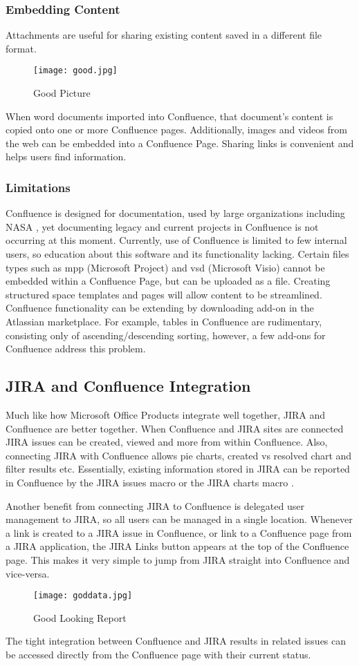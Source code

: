 \subsubsection{Embedding Content}
Attachments are useful for sharing existing content saved in a different file format. 
\begin{figure}[H]
	\centering
	\texttt{[image: good.jpg]}
	\caption{Good Picture}
\end{figure} 
When word documents imported into Confluence, that document's content is copied onto one or more Confluence pages. Additionally, images and videos from the web can be embedded into a Confluence Page. Sharing links is convenient and helps users find information.

\subsubsection{Limitations}
Confluence is designed for documentation, used by large organizations including NASA \cite{NASA:Online}, yet documenting legacy and current projects in Confluence is not occurring at this moment. Currently, use of Confluence is limited to few internal users, so education about this software and its functionality lacking. Certain files types such as mpp (Microsoft Project) and vsd (Microsoft Visio) cannot be embedded within a Confluence Page, but can be uploaded as a file.  Creating structured space templates and pages will allow content to be streamlined. Confluence functionality can be extending by downloading add-on in the Atlassian marketplace. For example, tables in Confluence are rudimentary, consisting only of ascending/descending sorting, however, a few add-ons for Confluence address this problem.

\subsection{JIRA and Confluence Integration}
Much like how Microsoft Office Products integrate well together, JIRA and Confluence are better together. When \gls{Confluence} and JIRA sites are connected JIRA issues can be created, viewed and more from within Confluence. Also, connecting JIRA with Confluence allows pie charts, created vs resolved chart and filter results etc.  Essentially, existing information stored in JIRA can be reported in Confluence by the JIRA issues macro or the JIRA charts macro \cite{JAC:Online}.

\noindent Another benefit from connecting JIRA to \gls{Confluence} is delegated user management to \gls{JIRA}, so all users can be managed in a single location. Whenever a link is created to a JIRA issue in Confluence, or link to a Confluence page from a JIRA application, the JIRA Links button appears at the top of the Confluence page. This makes it very simple to jump from JIRA straight into Confluence and vice-versa.
\begin{figure}[H]
	\centering
	\texttt{[image: goddata.jpg]}
	\caption{Good Looking Report}
\end{figure} 
\noindent The tight integration between Confluence and JIRA results in related issues can be accessed directly from the Confluence page with their current status.